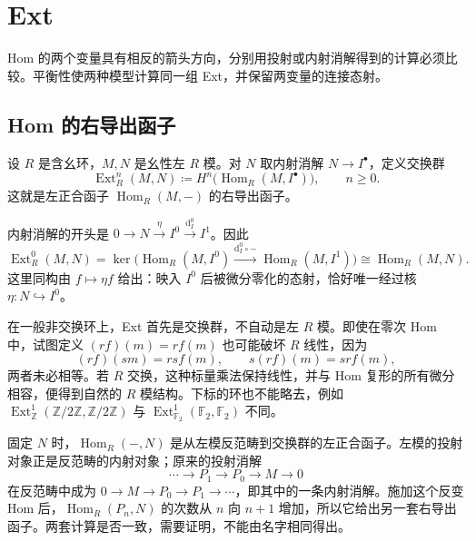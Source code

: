 
\section{Ext}
\label{b4:sec:0802}

Hom 的两个变量具有相反的箭头方向，分别用投射或内射消解得到的计算必须比较。平衡性使两种模型计算同一组 Ext，并保留两变量的连接态射。


%
%

\subsection{Hom 的右导出函子}
\label{b4:subsec:0802:01}

\begin{definition}\label{b4:def:ext}
	设 \(R\) 是含幺环，\(M,N\) 是幺性左 \(R\) 模。对 \(N\) 取内射消解 \(N\to I^\bullet\)，定义交换群
	\[
		\operatorname{Ext}_R^n(M,N)\coloneqq H^n\bigl(\operatorname{Hom}_R(M,I^\bullet)\bigr),\qquad n\ge0.
	\]
	这就是左正合函子 \(\operatorname{Hom}_R(M,-)\) 的右导出函子。
\end{definition}

内射消解的开头是 \(0\to N\xrightarrow{\eta}I^0\xrightarrow{\mathrm{d}_I^0}I^1\)。因此
\[
	\operatorname{Ext}_R^0(M,N) =\ker\bigl(\operatorname{Hom}_R(M,I^0) \xrightarrow{\mathrm{d}_I^0\circ-}\operatorname{Hom}_R(M,I^1)\bigr) \cong\operatorname{Hom}_R(M,N).
\]
这里同构由 \(f\mapsto\eta f\) 给出：映入 \(I^0\) 后被微分零化的态射，恰好唯一经过核 \(\eta:N\hookrightarrow I^0\)。

\ProseParagraphBreak
在一般非交换环上，Ext 首先是交换群，不自动是左 \(R\) 模。即使在零次 Hom 中，试图定义 \((rf)(m)=r f(m)\) 也可能破坏 \(R\) 线性，因为
\[
	(rf)(sm)=rs f(m),\qquad s(rf)(m)=sr f(m),
\]
两者未必相等。若 \(R\) 交换，这种标量乘法保持线性，并与 Hom 复形的所有微分相容，便得到自然的 \(R\) 模结构。下标的环也不能略去，例如 \(\operatorname{Ext}_{\mathbb Z}^1(\mathbb Z/2\mathbb Z,\mathbb Z/2\mathbb Z)\) 与 \(\operatorname{Ext}_{\mathbb F_2}^1(\mathbb F_2,\mathbb F_2)\) 不同。

\ProseParagraphBreak
固定 \(N\) 时，\(\operatorname{Hom}_R(-,N)\) 是从左模反范畴到交换群的左正合函子。左模的投射对象正是反范畴的内射对象；原来的投射消解
\[
	\cdots\longrightarrow P_1\longrightarrow P_0\longrightarrow M\longrightarrow0
\]
在反范畴中成为 \(0\to M\to P_0\to P_1\to\cdots\)，即其中的一条内射消解。施加这个反变 Hom 后，\(\operatorname{Hom}_R(P_n,N)\) 的次数从 \(n\) 向 \(n+1\) 增加，所以它给出另一套右导出函子。两套计算是否一致，需要证明，不能由名字相同得出。

